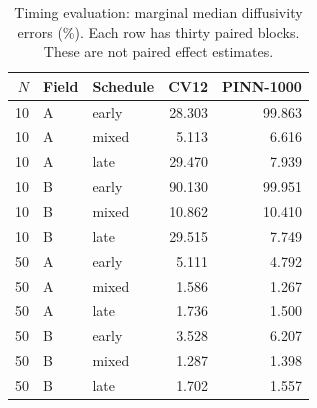 \begin{table}[htbp]\centering\small
\caption{Timing evaluation: marginal median diffusivity errors (\%). Each row has thirty paired blocks. These are not paired effect estimates.}\label{tab:timing}
\begin{tabular}{rllrr}\toprule
$N$ & Field & Schedule & CV12 & PINN-1000\\\midrule
10 & A & early & 28.303 & 99.863\\
10 & A & mixed & 5.113 & 6.616\\
10 & A & late & 29.470 & 7.939\\
10 & B & early & 90.130 & 99.951\\
10 & B & mixed & 10.862 & 10.410\\
10 & B & late & 29.515 & 7.749\\
50 & A & early & 5.111 & 4.792\\
50 & A & mixed & 1.586 & 1.267\\
50 & A & late & 1.736 & 1.500\\
50 & B & early & 3.528 & 6.207\\
50 & B & mixed & 1.287 & 1.398\\
50 & B & late & 1.702 & 1.557\\
\bottomrule\end{tabular}
\end{table}
